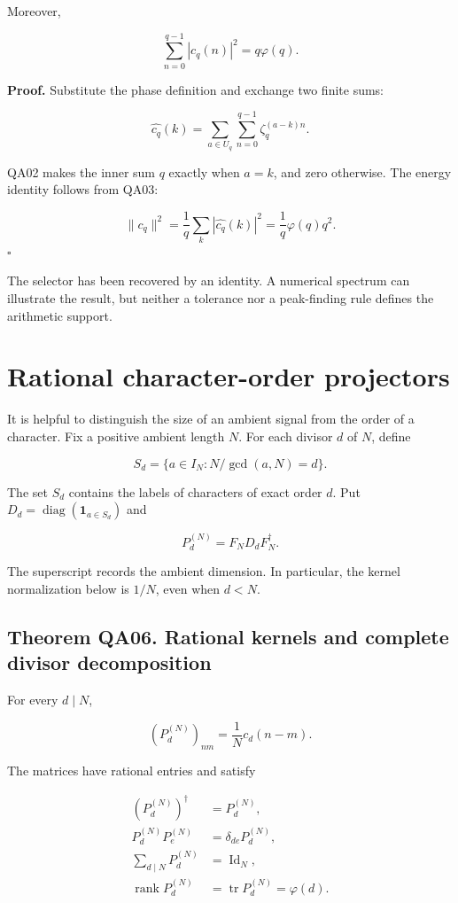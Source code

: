 Moreover,

\[
\sum_{n=0}^{q-1}|c_q(n)|^2=q\varphi(q).
\]

\textbf{Proof.} Substitute the phase definition and exchange two finite
sums:

\[
\widehat{c_q}(k)
=\sum_{a\in U_q}\sum_{n=0}^{q-1}\zeta_q^{(a-k)n}.
\]

QA02 makes the inner sum \(q\) exactly when \(a=k\), and zero otherwise.
The energy identity follows from QA03:

\[
\|c_q\|^2
=\frac1q\sum_k|\widehat{c_q}(k)|^2
=\frac1q\varphi(q)q^2.
\] \(\square\)

The selector has been recovered by an identity. A numerical spectrum can
illustrate the result, but neither a tolerance nor a peak-finding rule
defines the arithmetic support.

\hypertarget{q:rational-character-order-projectors}{%
\section{Rational character-order
projectors}\label{q:rational-character-order-projectors}}

It is helpful to distinguish the size of an ambient signal from the
order of a character. Fix a positive ambient length \(N\). For each
divisor \(d\) of \(N\), define

\[
S_d=\{a\in I_N:N/\gcd(a,N)=d\}.
\]

The set \(S_d\) contains the labels of characters of exact order \(d\).
Put \(D_d=\operatorname{diag}(\mathbf1_{a\in S_d})\) and

\[
P_d^{(N)}=F_ND_dF_N^\dagger.
\]

The superscript records the ambient dimension. In particular, the kernel
normalization below is \(1/N\), even when \(d<N\).

\hypertarget{q:theorem-qa06.-rational-kernels-and-complete-divisor-decomposition}{%
\subsection*{Theorem QA06. Rational kernels and complete divisor
decomposition}\label{q:theorem-qa06.-rational-kernels-and-complete-divisor-decomposition}}

For every \(d\mid N\),

\[
\boxed{(P_d^{(N)})_{nm}=\frac1N c_d(n-m).}
\]

The matrices have rational entries and satisfy

\[
\begin{aligned}
(P_d^{(N)})^\dagger&=P_d^{(N)},\\
P_d^{(N)}P_e^{(N)}&=\delta_{de}P_d^{(N)},\\
\sum_{d\mid N}P_d^{(N)}&=\operatorname{Id}_N,\\
\operatorname{rank}P_d^{(N)}&=\operatorname{tr}P_d^{(N)}=\varphi(d).
\end{aligned}
\]

